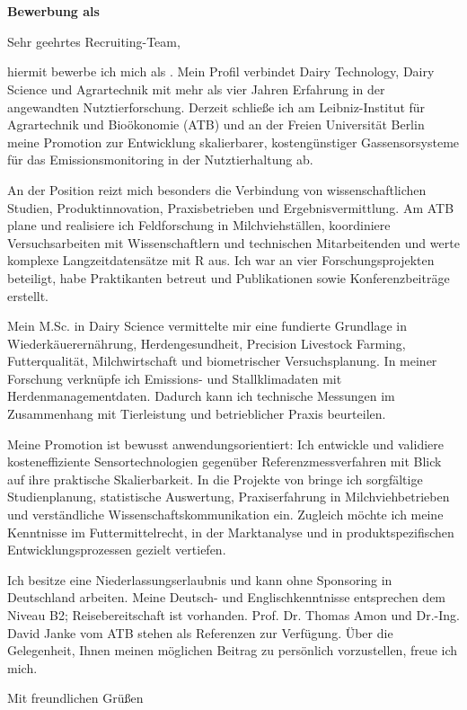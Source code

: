 
\CompanyName\\
\HiringTeamDE\\
\CompanyCityDE

\vspace{10pt}
\ApplicationDateDE

\vspace{10pt}
\textbf{Bewerbung als \JobTitleDE}

\vspace{8pt}
Sehr geehrtes Recruiting-Team,

hiermit bewerbe ich mich als \JobTitleDE. Mein Profil verbindet Dairy Technology, Dairy Science und Agrartechnik mit mehr als vier Jahren Erfahrung in der angewandten Nutztierforschung. Derzeit schließe ich am Leibniz-Institut für Agrartechnik und Bioökonomie (ATB) und an der Freien Universität Berlin meine Promotion zur Entwicklung skalierbarer, kostengünstiger Gassensorsysteme für das Emissionsmonitoring in der Nutztierhaltung ab.

An der Position reizt mich besonders die Verbindung von wissenschaftlichen Studien, Produktinnovation, Praxisbetrieben und Ergebnisvermittlung. Am ATB plane und realisiere ich Feldforschung in Milchviehställen, koordiniere Versuchsarbeiten mit Wissenschaftlern und technischen Mitarbeitenden und werte komplexe Langzeitdatensätze mit R aus. Ich war an vier Forschungsprojekten beteiligt, habe Praktikanten betreut und Publikationen sowie Konferenzbeiträge erstellt.

Mein M.Sc. in Dairy Science vermittelte mir eine fundierte Grundlage in Wiederkäuerernährung, Herdengesundheit, Precision Livestock Farming, Futterqualität, Milchwirtschaft und biometrischer Versuchsplanung. In meiner Forschung verknüpfe ich Emissions- und Stallklimadaten mit Herdenmanagementdaten. Dadurch kann ich technische Messungen im Zusammenhang mit Tierleistung und betrieblicher Praxis beurteilen.

Meine Promotion ist bewusst anwendungsorientiert: Ich entwickle und validiere kosteneffiziente Sensortechnologien gegenüber Referenzmessverfahren mit Blick auf ihre praktische Skalierbarkeit. In die Projekte von \CompanyName{} bringe ich sorgfältige Studienplanung, statistische Auswertung, Praxiserfahrung in Milchviehbetrieben und verständliche Wissenschaftskommunikation ein. Zugleich möchte ich meine Kenntnisse im Futtermittelrecht, in der Marktanalyse und in produktspezifischen Entwicklungsprozessen gezielt vertiefen.

Ich besitze eine Niederlassungserlaubnis und kann ohne Sponsoring in Deutschland arbeiten. Meine Deutsch- und Englischkenntnisse entsprechen dem Niveau B2; Reisebereitschaft ist vorhanden. Prof. Dr. Thomas Amon und Dr.-Ing. David Janke vom ATB stehen als Referenzen zur Verfügung. Über die Gelegenheit, Ihnen meinen möglichen Beitrag zu \CompanyName{} persönlich vorzustellen, freue ich mich.

Mit freundlichen Grüßen

\vspace{14pt}
\CandidateName

